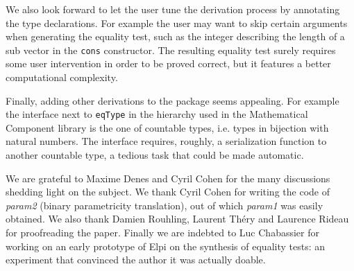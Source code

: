 \documentclass[a4paper,UKenglish,cleveref, autoref]{lipics-v2019}
\newcommand{\derive}[1]{\emph{#1}}
\begin{document}

We also look forward to let the user tune
the derivation process by annotating the type declarations.
For example the user may want to skip
certain arguments when generating the equality test, such as the
integer describing the length of a sub vector in the \lstinline+cons+
constructor. The resulting equality
test surely requires some user intervention in order 
to be proved correct, but it features a better computational complexity.

Finally, adding other derivations to the package seems appealing. For example
the interface next to \lstinline+eqType+ in the hierarchy used
in the Mathematical Component library is the one of countable types,
i.e. types in bijection with natural numbers. The interface
requires, roughly, a serialization function to another countable
type, a tedious task that could be made automatic.

We are grateful to Maxime Denes and Cyril Cohen for the many discussions
shedding light on the subject. We thank Cyril Cohen for writing the code 
of \derive{param2} (binary parametricity translation), out of which
\derive{param1} was easily obtained.  
We also thank Damien Rouhling, Laurent Th\'ery and Laurence Rideau
for proofreading the paper.
Finally we are indebted
to Luc Chabassier for working on an early prototype of Elpi on
the synthesis of equality tests: an experiment that convinced
the author it was actually doable.





\end{document}
